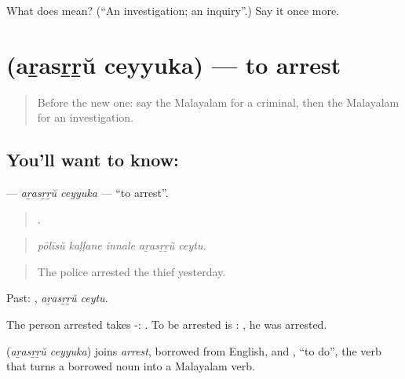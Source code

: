 \begin{tcolorbox}[breakable,colback=teal!4,colframe=teal!35!black,title={Before you move on}]
What does  mean? (\textquotedblleft{}An investigation; an inquiry\textquotedblright{}.) Say it once more.
\end{tcolorbox}
\section[\texorpdfstring{\ml{അറസ്റ്റ്} \ml{ചെയ്യുക} (aṟasṟṟŭ ceyyuka)}{അറസ്റ്റ് ചെയ്യുക (aṟasṟṟŭ ceyyuka)}]{  (aṟasṟṟŭ ceyyuka) — to arrest}

\label{lesson:ML-C365-arasrru-ceyyuka}



\begin{quote}
Before the new one: say the Malayalam for a criminal, then the Malayalam for an investigation.
\end{quote}

\subsection*{You'll want to know:  }
\textbf{ } — \emph{aṟasṟṟŭ ceyyuka} — \textquotedblleft{}to arrest\textquotedblright{}.

\begin{quote}
    .
\end{quote}

\begin{quote}
\emph{pōlīsŭ kaḷḷane innale aṟasṟṟŭ ceytu.}
\end{quote}

\begin{quote}
The police arrested the thief yesterday.
\end{quote}

Past:  , \emph{aṟasṟṟŭ ceytu}.

The person arrested takes -:   . To be arrested is :  , he was arrested.

\begin{cousinweb}
\textbf{ } (\emph{aṟasṟṟŭ ceyyuka}) joins \emph{arrest}, borrowed from English, and , \textquotedblleft{}to do\textquotedblright{}, the verb that turns a borrowed noun into a Malayalam verb.
\end{cousinweb}

